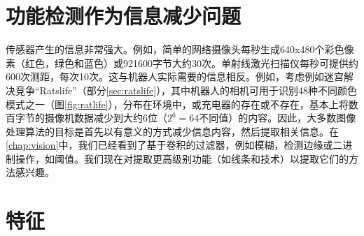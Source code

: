
\section{功能检测作为信息减少问题}
传感器产生的信息非常强大。例如，简单的网络摄像头每秒生成640x480个彩色像素（红色，绿色和蓝色）或921600字节大约30次。单射线激光扫描仪每秒可提供约600次测距，每次10次。这与机器人实际需要的信息相反。例如，考虑例如迷宫解决竞争“Ratslife”（部分\ref{sec:ratslife}），其中机器人的相机可用于识别48种不同颜色模式之一（图\ref{fig:ratlife}），分布在环境中，或充电器的存在或不存在，基本上将数百字节的摄像机数据减少到大约6位（$2^6=64$不同值）的内容。因此，大多数图像处理算法的目标是首先以有意义的方式减少信息内容，然后提取相关信息。在\ref{chap:vision}中，我们已经看到了基于卷积的过滤器，例如模糊，检测边缘或二进制操作，如阈值。我们现在对提取更高级别功能（如线条和技术）以提取它们的方法感兴趣。


\section{特征}

